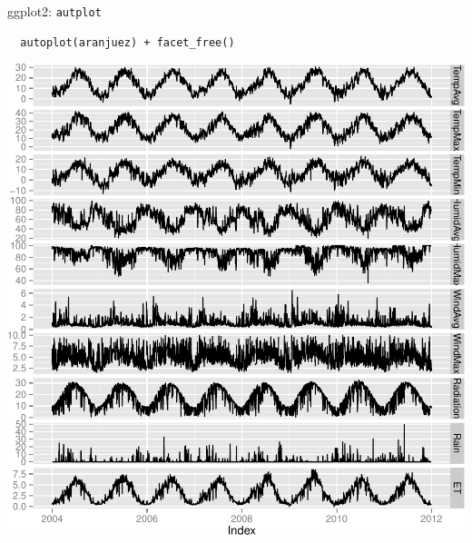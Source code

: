 \documentclass[xcolor={usenames,svgnames,dvipsnames}]{beamer}
\begin{document}
\begin{frame}[fragile,label=sec-2-1-2]{ggplot2: \texttt{autplot}}
 \lstset{language=R,label= ,caption= ,numbers=none}
\begin{lstlisting}
  autoplot(aranjuez) + facet_free()
\end{lstlisting}

\includegraphics[width=.9\linewidth]{figs/aranjuezGG.pdf}
\end{frame}
\end{document}
